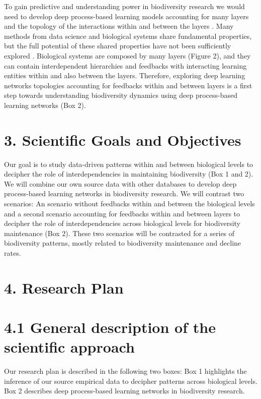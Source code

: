 \documentclass[11pt]{article}
\begin{document}
To gain predictive and understanding power in biodiversity research we
would need to develop deep process-based learning models accounting
for many layers and the topology of the interactions within and
between the layers
\citep{Whithametal:2006,Loeuille:2010,Fontaineetal:2011,Melianetal:2018}. Many
methods from data science and biological systems share fundamental
properties, but the full potential of these shared properties have not
been sufficiently explored \citep{Schmidhuber:2015}. Biological
systems are composed by many layers (Figure 2), and they can contain
interdependent hierarchies and feedbacks with interacting learning
entities within and also between the layers. Therefore, exploring deep
learning networks topologies accounting for feedbacks within and
between layers is a first step towards understanding biodiversity
dynamics using deep process-based learning networks (Box 2).


\section*{3. Scientific Goals and Objectives}
Our goal is to study data-driven patterns within and between
biological levels to decipher the role of interdependencies in
maintaining biodiversity (Box 1 and 2). We will combine our own source
data with other databases to develop deep process-based learning
networks in biodiversity research. We will contrast two scenarios: An
scenario without feedbacks within and between the biological levels
and a second scenario accounting for feedbacks within and between
layers to decipher the role of interdependencies across biological
levels for biodiversity maintenance (Box 2). These two scenarios will
be contrasted for a series of biodiversity patterns, mostly related to
biodiversity maintenance and decline rates.

\section*{4. Research Plan}

\section*{4.1 General description of the scientific approach}
Our research plan is described in the following two boxes: Box 1
highlights the inference of our source empirical data to decipher
patterns across biological levels. Box 2 describes deep process-based
learning networks in biodiversity research.
\end{document}
